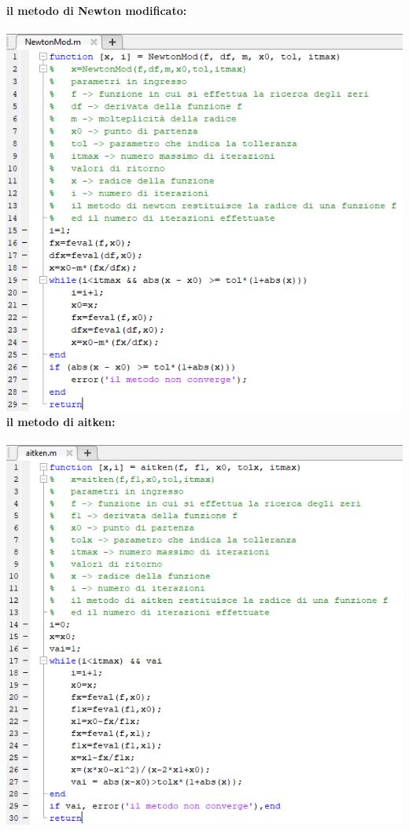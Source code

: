 \textbf{il metodo di Newton modificato:}
\\~\\
\includegraphics[width=1.3\linewidth]{img/NewtonMod}\newpage
\textbf{il metodo di aitken:}
\\~\\
\includegraphics[width=1.3\linewidth]{img/aitken}\newpage
{}
